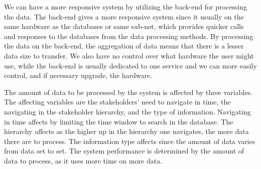 We can have a more responsive system by utilizing the back-end for processing 
the data. The back-end gives a more responsive system since it usually on the
same hardware as the databases or same sub-net, which provides quicker calls
and responses to the databases from the data processing methods. By processing 
the data on the back-end, the aggregation of data means that there is a lesser
data size to transfer. We also have no control over what hardware the user
might use, while the back-end is usually dedicated to one service and we can
more easily control, and if necessary upgrade, the hardware.

The amount of data to be processed by the system is affected by three 
variables. The affecting variables are the stakeholders' need to navigate in 
time, the navigating in the stakeholder hierarchy, and the type of information.
Navigating in time affects by limiting the time window to search in the
database. The hierarchy affects as the higher up in the hierarchy one
navigates, the more data there are to process. The information type affects
since the amount of data varies from data set to set. The system performance is
determined by the amount of data to process, as it uses more time on more data.

